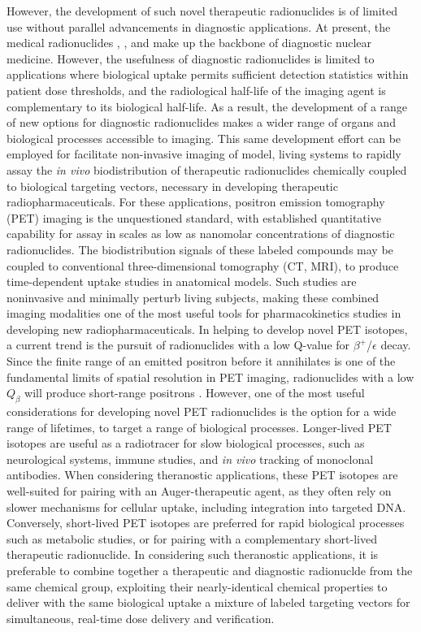 However, the development of such novel therapeutic radionuclides is of limited use without parallel advancements in diagnostic applications.
At present, the  medical radionuclides , , and  make up the backbone of diagnostic nuclear medicine.
However, the usefulness of diagnostic radionuclides is limited to applications where biological uptake permits sufficient detection statistics within patient dose thresholds, and the radiological half-life of the imaging agent is complementary to its biological half-life. 
As a result, the development of a range of new options for diagnostic radionuclides makes a wider range of organs and biological processes accessible to imaging.
This same development effort can be employed for facilitate  non-invasive imaging of model, living systems to rapidly assay the \emph{in vivo} biodistribution of therapeutic radionuclides chemically coupled to biological targeting vectors, necessary in developing therapeutic radiopharmaceuticals.
For these applications, positron emission tomography (PET) imaging is the unquestioned standard, with established quantitative capability for assay in scales as low as  nanomolar concentrations of diagnostic radionuclides. 
The biodistribution signals of these  labeled compounds may be coupled to conventional three-dimensional tomography (CT, MRI), to produce time-dependent uptake studies in anatomical models.
Such studies are noninvasive and minimally perturb living subjects, making these combined imaging modalities one of the most useful tools for pharmacokinetics studies in developing new radiopharmaceuticals.
In helping to develop novel PET isotopes, a current trend is the pursuit of radionuclides with a low Q-value for  $\beta^+$/$\epsilon$ decay.
Since the finite range of an emitted positron before it annihilates is one of the fundamental limits of spatial resolution in PET imaging, radionuclides with a low $Q_\beta$ will produce short-range positrons  \cite{bushberg2011essential}.
However, one of the most useful considerations for developing novel PET radionuclides is the option for a wide range of lifetimes, to target a range of biological processes.
Longer-lived PET isotopes are useful as a  radiotracer for slow biological processes, such as neurological systems, immune studies, and \emph{in vivo} tracking of  monoclonal antibodies.
When considering theranostic applications, these PET isotopes are well-suited for pairing with an Auger-therapeutic agent, as they often rely on slower mechanisms for cellular uptake, including integration into targeted DNA.
Conversely, short-lived PET isotopes are preferred for rapid biological processes such as metabolic studies, or for pairing with a complementary short-lived therapeutic radionuclide.
In considering such theranostic applications, it is preferable to combine together a therapeutic and diagnostic radionuclde from the same chemical group, exploiting their nearly-identical chemical properties to deliver with the same biological uptake a mixture of labeled targeting vectors for simultaneous, real-time dose delivery and verification. 






